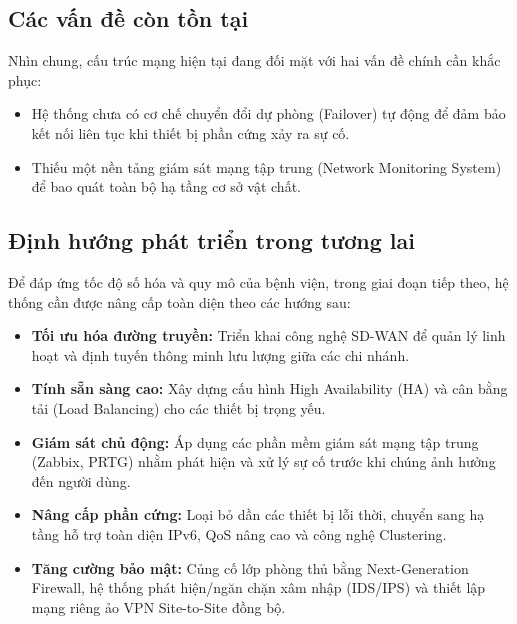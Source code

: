 \subsection{Các vấn đề còn tồn tại}
Nhìn chung, cấu trúc mạng hiện tại đang đối mặt với hai vấn đề chính cần khắc phục:
\begin{itemize}
    \item Hệ thống chưa có cơ chế chuyển đổi dự phòng (Failover) tự động để đảm bảo kết nối liên tục khi thiết bị phần cứng xảy ra sự cố.
    \item Thiếu một nền tảng giám sát mạng tập trung (Network Monitoring System) để bao quát toàn bộ hạ tầng cơ sở vật chất.
\end{itemize}

\subsection{Định hướng phát triển trong tương lai}
Để đáp ứng tốc độ số hóa và quy mô của bệnh viện, trong giai đoạn tiếp theo, hệ thống cần được nâng cấp toàn diện theo các hướng sau:
\begin{itemize}
    \item \textbf{Tối ưu hóa đường truyền:} Triển khai công nghệ SD-WAN để quản lý linh hoạt và định tuyến thông minh lưu lượng giữa các chi nhánh.
    \item \textbf{Tính sẵn sàng cao:} Xây dựng cấu hình High Availability (HA) và cân bằng tải (Load Balancing) cho các thiết bị trọng yếu.
    \item \textbf{Giám sát chủ động:} Áp dụng các phần mềm giám sát mạng tập trung (Zabbix, PRTG) nhằm phát hiện và xử lý sự cố trước khi chúng ảnh hưởng đến người dùng.
    \item \textbf{Nâng cấp phần cứng:} Loại bỏ dần các thiết bị lỗi thời, chuyển sang hạ tầng hỗ trợ toàn diện IPv6, QoS nâng cao và công nghệ Clustering.
    \item \textbf{Tăng cường bảo mật:} Củng cố lớp phòng thủ bằng Next-Generation Firewall, hệ thống phát hiện/ngăn chặn xâm nhập (IDS/IPS) và thiết lập mạng riêng ảo VPN Site-to-Site đồng bộ.
\end{itemize}